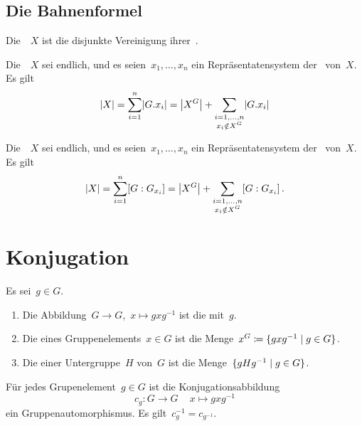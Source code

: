 \subsection{Die Bahnenformel}

\begin{proposition}
  Die~~$X$ ist die disjunkte Vereinigung ihrer~.
\end{proposition}

\begin{corollary}
  Die~~$X$ sei endlich, und es seien~$x_1, \dotsc, x_n$ ein Repräsentatensystem der~ von~$X$.
  Es gilt
  \[
    \card{X}
    =
    \sum_{i=1}^n \card{G.x_i}
    =
    \card*{X^G}
    +
    \sum_{\substack{i=1, \dotsc, n \\ x_i \notin X^G}}
    \card{G.x_i}
  \]
\end{corollary}

\begin{theorem}[Bahnenformel]
  Die~~$X$ sei endlich, und es seien~$x_1, \dotsc, x_n$ ein Repräsentatensystem der~ von~$X$.
  Es gilt
  \[
    \card{X}
    =
    \sum_{i=1}^n [G : G_{x_i}]
    =
    \card*{X^G}
    +
    \sum_{\substack{i=1, \dotsc, n \\ x_i \notin X^G}}
    [G : G_{x_i}] \,.
  \]
\end{theorem}



\section{Konjugation}

\begin{definition}
  Es sei~$g \in G$.
  \begin{enumerate}
    \item
      Die Abbildung~$G \to G$,~$x \mapsto g x g^{-1}$ ist die  mit~$g$.
    \item
      Die  eines Gruppenelements~$x \in G$ ist die Menge~$x^G \defined \{ g x g^{-1} \suchthat g \in G \}$.
    \item
      Die  einer Untergruppe~$H$ von~$G$ ist die Menge~$\{ g H g^{-1} \suchthat g \in G \}$.
  \end{enumerate}
\end{definition}

\begin{proposition}
  Für jedes Grupenelement~$g \in G$ ist die Konjugationsabbildung
  \[
    c_g
    \colon
    G \to G \,
    \quad
    x \mapsto g x g^{-1}
  \]
  ein Gruppenautomorphismus.
  Es gilt~$c_g^{-1} = c_{g^{-1}}$.
\end{proposition}

